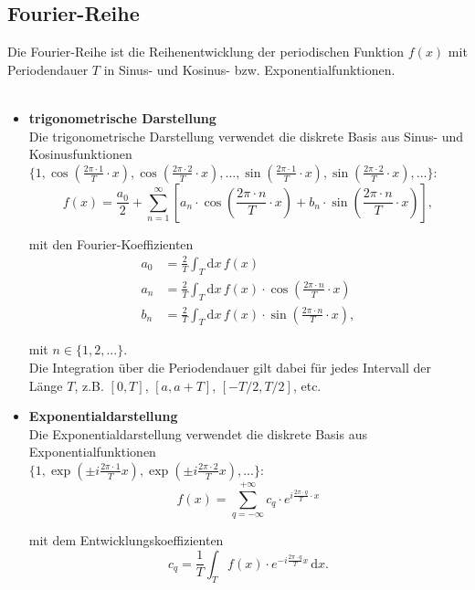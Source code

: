 \documentclass{article}
\newcommand{\diff}{\mathrm{d}}
\newcommand{\lr}[1]{\left(#1\right)}
\newcommand{\lreck}[1]{\left[#1\right]}
\begin{document}
\subsection{Fourier-Reihe}
Die Fourier-Reihe ist die Reihenentwicklung der periodischen Funktion $f(x)$ mit Periodendauer $T$ in Sinus- und Kosinus- bzw. Exponentialfunktionen.\\
\\
	\begin{itemize}
		\item \textbf{trigonometrische Darstellung}\\
		Die trigonometrische Darstellung verwendet die diskrete Basis aus Sinus- und Kosinusfunktionen
		$\{1, \cos \lr{ \frac{2\pi \cdot 1}{T} \cdot x }, \cos \lr{ \frac{2\pi \cdot 2}{T} \cdot x}, ..., \sin \lr{ \frac{2\pi \cdot 1}{T} \cdot x }, \sin \lr{ \frac{2\pi \cdot 2}{T} \cdot x }, ... \}$:
			\begin{equation}
				f(x) = \frac{a_0}{2} + \sum_{n=1}^\infty \lreck{ a_n \cdot \cos \lr{ \frac{2\pi \cdot n}{T} \cdot x } + b_n \cdot \sin \lr{ \frac{2\pi \cdot n}{T} \cdot x } },
			\end{equation}

		mit den Fourier-Koeffizienten
			\begin{align}
				a_0 &= \frac{2}{T} \int_T \diff x \, f(x) \\
				a_n &= \frac{2}{T} \int_T \diff x \, f(x) \cdot \cos \lr{ \frac{2\pi \cdot n}{T} \cdot x } \\
				b_n &= \frac{2}{T} \int_T \diff x \, f(x) \cdot \sin \lr{ \frac{2\pi \cdot n}{T} \cdot x },
			\end{align}

		mit $n \in \{1, 2, ... \}$.\\
		Die Integration über die Periodendauer gilt dabei für jedes Intervall der Länge $T$, z.B. $[0,T]$, $[a,a+T]$, $[-T/2,T/2]$, etc.
		
		
		\item \textbf{Exponentialdarstellung}\\
		Die Exponentialdarstellung verwendet die diskrete Basis aus Exponentialfunktionen\\
		$\{1, \exp\lr{ \pm i \frac{2\pi \cdot 1}{T}x }, \exp\lr{ \pm i \frac{2\pi \cdot 2}{T}x }, ... \}$:
			\begin{equation}
				f(x) = \sum_{q=-\infty}^{+\infty} c_q \cdot e^{i\frac{2\pi \cdot q}{T} \cdot x}
			\end{equation}

		mit dem Entwicklungskoeffizienten
			\begin{equation}
				c_q = \frac{1}{T} \int_T f(x) \cdot e^{-i \frac{2\pi \cdot q}{T} x} \, \diff x.
			\end{equation}
	\end{itemize}
\end{document}
